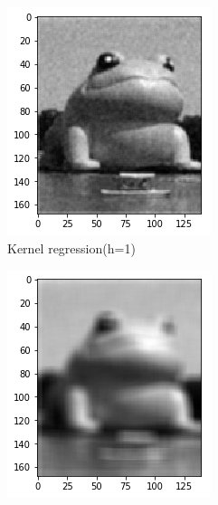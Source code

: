 \documentclass{article}
\begin{document}
\begin{figure}[htb]
\begin{subfigure}[b]{0.24\linewidth}
    \includegraphics[width=\linewidth]{images/noise_removal_2.png}
    \caption{Kernel regression(h=1)}
  \end{subfigure}
  \begin{subfigure}[b]{0.24\linewidth}
    \includegraphics[width=\linewidth]{images/noise_removal_3.png}

\end{subfigure}
\end{figure}
\end{document}
